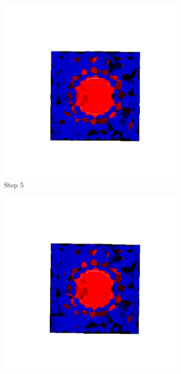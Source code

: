 \begin{figure}[ht!]
      \begin{subfigure}{.25\textwidth}
        \centering
        \includegraphics[width=1.0\linewidth]{Files/Small_ASR/IS/DEP5-STEP(005).png}
      \caption{Step 5}
      \end{subfigure}%
      \begin{subfigure}{.25\textwidth}
        \centering
        \includegraphics[width=1.0\linewidth]{Files/Small_ASR/IS/DEP5-STEP(006).png}

\end{subfigure}
\end{figure}
